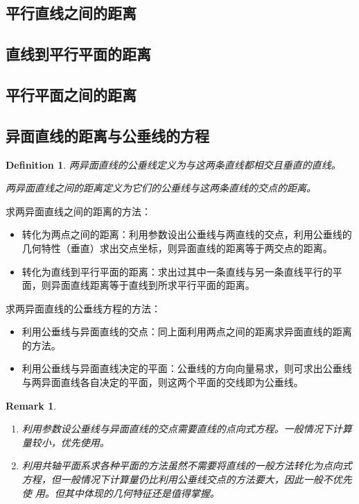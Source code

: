 \documentclass[onecolumn]{ctexart}
\newtheorem{definition}{Definition}
\newtheorem{remark}{Remark}
\begin{document}
\subsection{平行直线之间的距离}

\subsection{直线到平行平面的距离}

\subsection{平行平面之间的距离}

\subsection{异面直线的距离与公垂线的方程}

\begin{definition}
  两异面直线的公垂线定义为与这两条直线都相交且垂直的直线。

  两异面直线之间的距离定义为它们的公垂线与这两条直线的交点的距离。
\end{definition}

求两异面直线之间的距离的方法：
\begin{itemize}
  \item 转化为两点之间的距离：利用参数设出公垂线与两直线的交点，利用公垂线的几何特性（垂直）求出交点坐标，则异面直线的距离等于两交点的距离。
  \item 转化为直线到平行平面的距离：求出过其中一条直线与另一条直线平行的平面，则异面直线距离等于直线到所求平行平面的距离。
\end{itemize}

求两异面直线的公垂线方程的方法：
\begin{itemize}
  \item 利用公垂线与异面直线的交点：同上面利用两点之间的距离求异面直线的距离的方法。
  \item 利用公垂线与异面直线决定的平面：公垂线的方向向量易求，则可求出公垂线与两异面直线各自决定的平面，则这两个平面的交线即为公垂线。
\end{itemize}

\begin{remark}
  \begin{enumerate}
    \item 利用参数设公垂线与异面直线的交点需要直线的点向式方程。一般情况下计算量较小，优先使用。
    \item 利用共轴平面系求各种平面的方法虽然不需要将直线的一般方法转化为点向式方程，但一般情况下计算量仍比利用公垂线交点的方法要大，因此一般不优先使
    用。但其中体现的几何特征还是值得掌握。
  \end{enumerate}
\end{remark}
\end{document}
